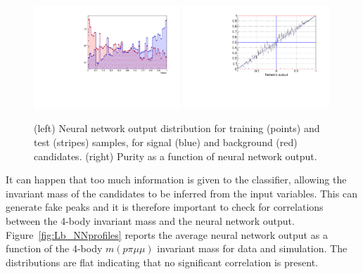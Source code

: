 \begin{figure}
\centering
\includegraphics[width=0.49\textwidth]{Lmumu/figs/TrainAndTest.pdf}
\includegraphics[width=0.49\textwidth]{Lmumu/figs/purity_NN.pdf}
\caption{(left) Neural network output distribution for training (points) and test (stripes) samples,
for signal (blue) and background (red) candidates. (right) Purity as a function of neural network output.}
\label{fig:Lb_nnDist}
\end{figure}
%
It can happen that too much information is given to the classifier, allowing
 the invariant mass of the candidates to be inferred from the input variables.
This can generate fake peaks and it is therefore important to check
for correlations between the 4-body invariant mass and the neural network output.
Figure~\ref{fig:Lb_NNprofiles} reports the average neural network output as a function of
the 4-body $m(p\pi\mu\mu)$ invariant mass for data and simulation. The distributions
are flat indicating that no significant correlation is present.
%
